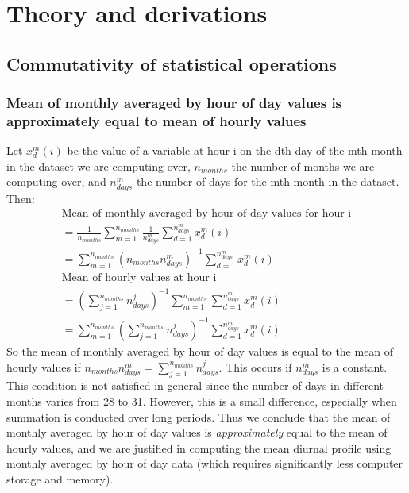 \chapter{Theory and derivations}
\label{app:derive}

\section{Commutativity of statistical operations}
\label{sec:commutativity}

\subsection[Mean of monthly averaged vs hourly data]{Mean of monthly averaged by hour of day values is approximately equal to mean of hourly values}

Let $x^m_d(i)$ be the value of a variable at hour i on the dth day of the mth month in the dataset we are computing over, $n_{months}$ the number of months we are computing over, and $n^m_{days}$ the number of days for the mth month in the dataset. Then:
\begin{eqnarray}
	\mbox{Mean of monthly averaged by hour of day values for hour i} \\
	= \frac{1}{n_{months}} \sum_{m=1}^{n_{months}} \frac{1}{n^m_{days}} \sum_{d=1}^{n^m_{days}} x^m_d (i) \nonumber \\
	= \sum_{m=1}^{n_{months}} (n_{months} n^m_{days})^{-1} \sum_{d=1}^{n^m_{days}} x^m_d (i) \nonumber \\
	\mbox{Mean of hourly values at hour i} \\
	= \left( \sum_{j=1}^{n_{months}} n^j_{days} \right)^{-1} \sum_{m=1}^{n_{months}} \sum_{d=1}^{n^m_{days}} x^m_d (i) \nonumber \\
	= \sum_{m=1}^{n_{months}} \left( \sum_{j=1}^{n_{months}} n^j_{days} \right)^{-1} \sum_{d=1}^{n^m_{days}} x^m_d (i) \nonumber
\end{eqnarray}
So the mean of monthly averaged by hour of day values is equal to the mean of hourly values if $n_{months} n^m_{days} = \sum_{j=1}^{n_{months}} n^j_{days}$. This occurs if $n^m_{days}$ is a constant. This condition is not satisfied in general since the number of days in different months varies from 28 to 31. However, this is a small difference, especially when summation is conducted over long periods. Thus we conclude that the mean of monthly averaged by hour of day values is \textit{approximately} equal to the mean of hourly values, and we are justified in computing the mean diurnal profile using monthly averaged by hour of day data (which requires significantly less computer storage and memory).

